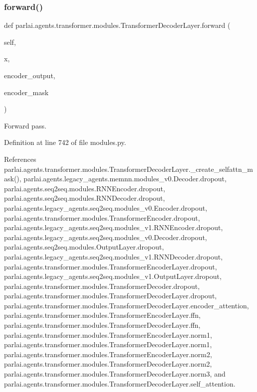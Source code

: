 \subsubsection{\texorpdfstring{forward()}{forward()}}
{\footnotesize\ttfamily def parlai.\+agents.\+transformer.\+modules.\+Transformer\+Decoder\+Layer.\+forward (\begin{DoxyParamCaption}\item[{}]{self,  }\item[{}]{x,  }\item[{}]{encoder\+\_\+output,  }\item[{}]{encoder\+\_\+mask }\end{DoxyParamCaption})}

\begin{DoxyVerb}Forward pass.\end{DoxyVerb}
 

Definition at line 742 of file modules.\+py.



References parlai.\+agents.\+transformer.\+modules.\+Transformer\+Decoder\+Layer.\+\_\+create\+\_\+selfattn\+\_\+mask(), parlai.\+agents.\+legacy\+\_\+agents.\+memnn.\+modules\+\_\+v0.\+Decoder.\+dropout, parlai.\+agents.\+seq2seq.\+modules.\+R\+N\+N\+Encoder.\+dropout, parlai.\+agents.\+seq2seq.\+modules.\+R\+N\+N\+Decoder.\+dropout, parlai.\+agents.\+legacy\+\_\+agents.\+seq2seq.\+modules\+\_\+v0.\+Encoder.\+dropout, parlai.\+agents.\+transformer.\+modules.\+Transformer\+Encoder.\+dropout, parlai.\+agents.\+legacy\+\_\+agents.\+seq2seq.\+modules\+\_\+v1.\+R\+N\+N\+Encoder.\+dropout, parlai.\+agents.\+legacy\+\_\+agents.\+seq2seq.\+modules\+\_\+v0.\+Decoder.\+dropout, parlai.\+agents.\+seq2seq.\+modules.\+Output\+Layer.\+dropout, parlai.\+agents.\+legacy\+\_\+agents.\+seq2seq.\+modules\+\_\+v1.\+R\+N\+N\+Decoder.\+dropout, parlai.\+agents.\+transformer.\+modules.\+Transformer\+Encoder\+Layer.\+dropout, parlai.\+agents.\+legacy\+\_\+agents.\+seq2seq.\+modules\+\_\+v1.\+Output\+Layer.\+dropout, parlai.\+agents.\+transformer.\+modules.\+Transformer\+Decoder.\+dropout, parlai.\+agents.\+transformer.\+modules.\+Transformer\+Decoder\+Layer.\+dropout, parlai.\+agents.\+transformer.\+modules.\+Transformer\+Decoder\+Layer.\+encoder\+\_\+attention, parlai.\+agents.\+transformer.\+modules.\+Transformer\+Encoder\+Layer.\+ffn, parlai.\+agents.\+transformer.\+modules.\+Transformer\+Decoder\+Layer.\+ffn, parlai.\+agents.\+transformer.\+modules.\+Transformer\+Encoder\+Layer.\+norm1, parlai.\+agents.\+transformer.\+modules.\+Transformer\+Decoder\+Layer.\+norm1, parlai.\+agents.\+transformer.\+modules.\+Transformer\+Encoder\+Layer.\+norm2, parlai.\+agents.\+transformer.\+modules.\+Transformer\+Decoder\+Layer.\+norm2, parlai.\+agents.\+transformer.\+modules.\+Transformer\+Decoder\+Layer.\+norm3, and parlai.\+agents.\+transformer.\+modules.\+Transformer\+Decoder\+Layer.\+self\+\_\+attention.



